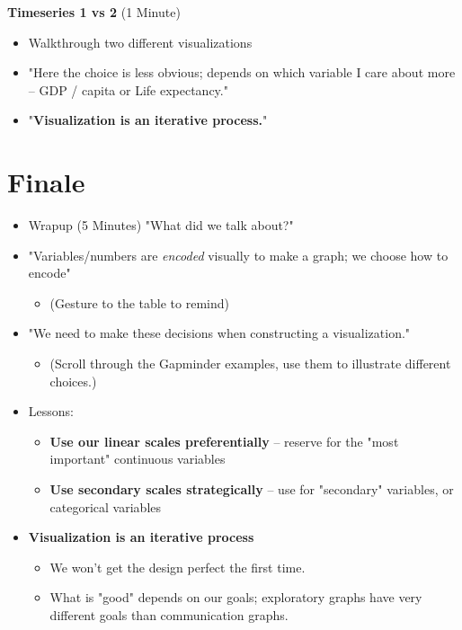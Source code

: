 \documentclass[11pt]{article}
\begin{document}
\textbf{Timeseries 1 vs 2} (1 Minute)
\begin{itemize}
\item Walkthrough two different visualizations
\item "Here the choice is less obvious; depends on which variable I care about more
-- GDP / capita or Life expectancy."
\item "\textbf{Visualization is an iterative process.}"
\end{itemize}

\section{Finale}
\label{sec:orgf35abf9}
\begin{itemize}
\item Wrapup (5 Minutes) "What did we talk about?"

\item "Variables/numbers are \emph{encoded} visually to make a graph; we choose how to encode"
\begin{itemize}
\item (Gesture to the table to remind)
\end{itemize}
\item "We need to make these decisions when constructing a visualization."
\begin{itemize}
\item (Scroll through the Gapminder examples, use them to illustrate different choices.)
\end{itemize}
\item Lessons:
\begin{itemize}
\item \textbf{Use our linear scales preferentially} -- reserve for the "most important"
continuous variables
\item \textbf{Use secondary scales strategically} -- use for "secondary" variables, or
categorical variables
\end{itemize}
\item \textbf{Visualization is an iterative process}
\begin{itemize}
\item We won't get the design perfect the first time.
\end{itemize}
\begin{itemize}
\item What is "good" depends on our goals; exploratory graphs have very different
goals than communication graphs.
\end{itemize}
\end{itemize}
\end{document}
